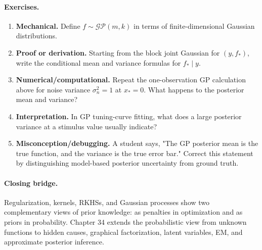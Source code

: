 \paragraph{Exercises.}
\begin{enumerate}[label=\textbf{33.4.\arabic*.}, leftmargin=*]
\item \textbf{Mechanical.} Define \(f\sim\mathcal{GP}(m,k)\) in terms of finite-dimensional Gaussian distributions.
\item \textbf{Proof or derivation.} Starting from the block joint Gaussian for \((y,f_*)\), write the conditional mean and variance formulas for \(f_*\mid y\).
\item \textbf{Numerical/computational.} Repeat the one-observation GP calculation above for noise variance \(\sigma_n^2=1\) at \(x_*=0\). What happens to the posterior mean and variance?
\item \textbf{Interpretation.} In GP tuning-curve fitting, what does a large posterior variance at a stimulus value usually indicate?
\item \textbf{Misconception/debugging.} A student says, "The GP posterior mean is the true function, and the variance is the true error bar." Correct this statement by distinguishing model-based posterior uncertainty from ground truth.
\end{enumerate}

\paragraph{Closing bridge.}
Regularization, kernels, RKHSs, and Gaussian processes show two complementary views of prior knowledge: as penalties in optimization and as priors in probability. Chapter 34 extends the probabilistic view from unknown functions to hidden causes, graphical factorization, latent variables, EM, and approximate posterior inference.

\clearpage
